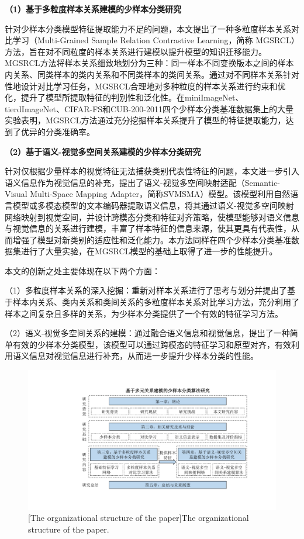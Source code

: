 \textbf{（1）基于多粒度样本关系建模的少样本分类研究}

针对少样本分类模型特征提取能力不足的问题，本文提出了一种多粒度样本关系对比学习（Multi-Grained Sample Relation Contrastive Learning，简称 MGSRCL）方法，旨在对不同粒度的样本关系进行建模以提升模型的知识迁移能力。MGSRCL方法将样本关系细致地划分为三种：同一样本不同变换版本之间的样本内关系、同类样本的类内关系和不同类样本的类间关系。通过对不同样本关系针对性地设计对比学习任务，MGSRCL合理地对多种粒度的样本关系进行约束和优化，提升了模型所提取特征的判别性和泛化性。在miniImageNet\cite{vinyals2016matching}、tierdImageNet\cite{ren2018meta}、CIFAR-FS\cite{bertinetto2018meta}和CUB-200-2011\cite{wah2011caltech}四个少样本分类基准数据集上的大量实验表明，MGSRCL方法通过充分挖掘样本关系提升了模型的特征提取能力，达到了优异的分类准确率。

\textbf{（2）基于语义-视觉多空间关系建模的少样本分类研究}

针对仅根据少量样本的视觉特征无法捕获类别代表性特征的问题，本文进一步引入语义信息作为视觉信息的补充，提出了语义-视觉多空间映射适配（Semantic-Visual Multi-Space Mapping Adapter，简称SVMSMA）模型。该模型利用自然语言模型或多模态模型的文本编码器提取语义信息，将其通过语义-视觉多空间映射网络映射到视觉空间，并设计跨模态分类和特征对齐策略，使模型能够对语义信息与视觉信息的关系进行建模，丰富了样本特征的信息来源，使其更具有代表性，从而增强了模型对新类别的适应性和泛化能力。本方法同样在四个少样本分类基准数据集进行了大量实验，在MGSRCL模型的基础上取得了进一步的性能提升。

本文的创新之处主要体现在以下两个方面：

（1）多粒度样本关系的深入挖掘：重新对样本关系进行了思考与划分并提出了基于样本内关系、类内关系和类间关系的多粒度样本关系对比学习方法，充分利用了样本之间复杂且多样的关系，为少样本分类提供了一个有效的特征学习方法。

（2）语义-视觉多空间关系的建模：通过融合语义信息和视觉信息，提出了一种简单有效的少样本分类模型，该模型可以通过跨模态的特征学习和原型对齐，有效利用语义信息对视觉信息进行补充，从而进一步提升少样本分类的性能。

\begin{figure}[h]
    \centering
    \includegraphics[width=1.0\columnwidth]{figures/组织结构.pdf}
    [The organizational structure of the paper]{The organizational structure of the paper.}
    \label{figure1: 组织结构}
\end{figure}

